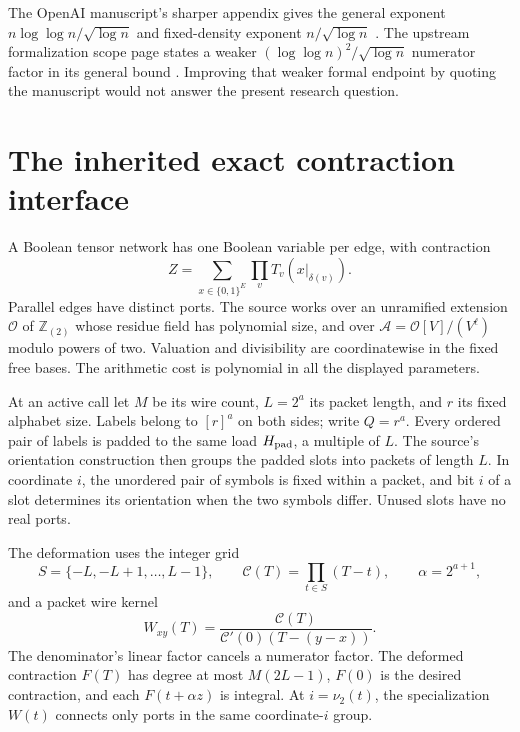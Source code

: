 \documentclass[11pt,letterpaper]{article}
\theoremstyle{remark}\newtheorem{remark}[theorem]{Remark}
\newcommand{\Ztwo}{\mathbb Z_{(2)}}
\begin{document}
The OpenAI manuscript's sharper appendix gives the general exponent
$n\log\log n/\sqrt{\log n}$ and fixed-density exponent
$n/\sqrt{\log n}$ \cite{upstream,reduction}. The upstream formalization
scope page states a weaker $(\log\log n)^2/\sqrt{\log n}$ numerator
factor in its general bound \cite{leanscope}. Improving that weaker
formal endpoint by quoting the manuscript would not answer the present
research question.

\section{The inherited exact contraction interface}
\label{sec:interface}
A Boolean tensor network has one Boolean variable per edge, with
contraction
\[
 Z=\sum_{x\in\{0,1\}^{E}}\prod_v T_v(x|_{\delta(v)}).
\]
Parallel edges have distinct ports. The source works over an unramified
extension $\mathcal O$ of $\Ztwo$ whose residue field has polynomial size,
and over $\mathcal A=\mathcal O[V]/(V^\ell)$ modulo powers of two.
Valuation and divisibility are coordinatewise in the fixed free bases.
The arithmetic cost is polynomial in all the displayed parameters.

At an active call let $M$ be its wire count, $L=2^a$ its packet length,
and $r$ its fixed alphabet size. Labels belong to $[r]^a$ on both sides;
write $Q=r^a$. Every ordered pair of labels is padded to the same load
$H_{\rm pad}$, a multiple of $L$. The source's orientation construction
then groups the padded slots into packets of length $L$. In coordinate
$i$, the unordered pair of symbols is fixed within a packet, and bit $i$
of a slot determines its orientation when the two symbols differ.
Unused slots have no real ports.

The deformation uses the integer grid
\[
 S=\{-L,-L+1,\ldots,L-1\},\qquad
 \mathcal C(T)=\prod_{t\in S}(T-t),\qquad \alpha=2^{a+1},
\]
and a packet wire kernel
\begin{equation}\label{eq:cauchy-interface}
 W_{xy}(T)=\frac{\mathcal C(T)}{\mathcal C'(0)(T-(y-x))}.
\end{equation}
The denominator's linear factor cancels a numerator factor.
The deformed contraction $F(T)$ has degree at most $M(2L-1)$,
$F(0)$ is the desired contraction, and each $F(t+\alpha z)$ is integral.
At $i=\nu_2(t)$, the specialization $W(t)$ connects only ports in the
same coordinate-$i$ group.
\end{document}
